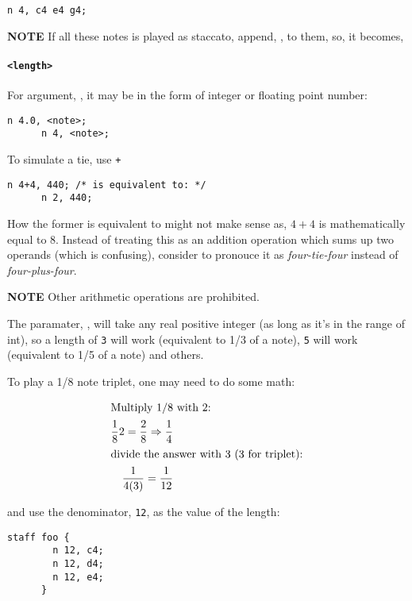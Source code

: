 \begin{Verbatim}[frame=single]
      n 4, c4 e4 g4;
\end{Verbatim}

\textbf{NOTE} If all these notes is played as staccato, append,
, to them, so, it becomes, 

\paragraph{\texttt{<length>}} For argument, , it may be in the form of integer or floating point number:
\label{nlength}

\begin{Verbatim}[frame=single]
      n 4.0, <note>;
      n 4, <note>;
\end{Verbatim}

\np To simulate a tie, use \verb-+-

\begin{Verbatim}[frame=single]
      n 4+4, 440; /* is equivalent to: */
      n 2, 440; 
\end{Verbatim}

\np How the former is equivalent to  might
not make sense as, $4+4$ is mathematically equal to 8. Instead
of treating this as an addition operation which sums up two
operands (which is confusing), consider to pronouce it as
\textit{four-tie-four} instead of \textit{four-plus-four}.
 
\textbf{NOTE} Other arithmetic operations are prohibited.

\np The paramater, , will take any real positive integer (as long as it's in the range of int),
so a length of \verb+3+ will work (equivalent to 1/3 of a note), \verb+5+ will work (equivalent to 1/5
of a note) and others.

\np To play a 1/8 note triplet, one may need to do some math:

\begin{align}
	\shortintertext{Multiply 1/8 with 2:}
	\frac{1}{8}2 = \frac{2}{8} \Rightarrow \frac{1}{4} \\
	\shortintertext{divide the answer with 3 (3 for triplet):}
	\frac{1}{4(3)} = \frac{1}{12}
\end{align}

and use the denominator, \verb+12+, as the value of the length:
\begin{Verbatim}[frame=single]
      staff foo {
        n 12, c4;
        n 12, d4;
        n 12, e4;
      }
\end{Verbatim}

